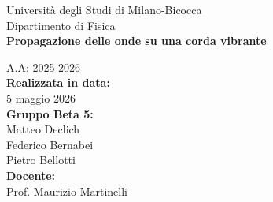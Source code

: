 \documentclass[a4paper,12pt]{article}
\begin{document}
\begin{titlepage}
    \begin{center}
        \vspace*{1cm}
        \Large{Università degli Studi di Milano-Bicocca}\\
        \Large{Dipartimento di Fisica }\\
        \Huge{\textbf{Propagazione delle onde su una corda vibrante}}
        
        \vspace{1.5cm}
        \large{A.A: 2025-2026}\\
        \vspace{2cm}
        \large{\textbf{Realizzata in data:}}\\
        \large{5 maggio 2026}\\
        \vspace{1cm}
        \large{\textbf{Gruppo Beta 5:}}\\
        \large{Matteo Declich}\\
        \large{Federico Bernabei}\\
        \large{Pietro Bellotti}\\
        \vspace{1cm}
        \large{\textbf{Docente:}}\\
        \large{Prof. Maurizio Martinelli}\\
        
        \vfill
        \vspace{0.8cm}
    \end{center}
\end{titlepage}

\tableofcontents
\newpage








\nocite{*}
\printbibliography[heading=bibintoc]
\end{document}
